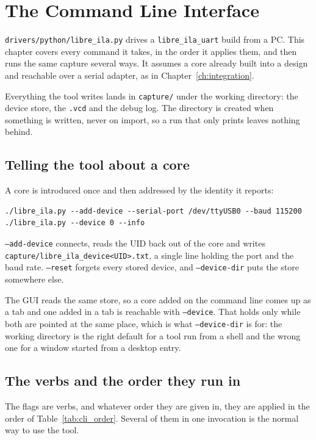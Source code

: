 \documentclass[../manual.tex]{subfiles}
\begin{document}
\chapter{The Command Line Interface}
\label{ch:cli}

\texttt{drivers/python/libre\_ila.py} drives a \texttt{libre\_ila\_uart} build from a PC. This chapter covers every command it takes, in the order it applies them, and then runs the same capture several ways. It assumes a core already built into a design and reachable over a serial adapter, as in Chapter~\ref{ch:integration}.

Everything the tool writes lands in \texttt{capture/} under the working directory: the device store, the \texttt{.vcd} and the debug log. The directory is created when something is written, never on import, so a run that only prints leaves nothing behind.

\section{Telling the tool about a core}
\label{sec:cli_devices}

A core is introduced once and then addressed by the identity it reports:

\begin{lstlisting}
./libre_ila.py --add-device --serial-port /dev/ttyUSB0 --baud 115200
./libre_ila.py --device 0 --info
\end{lstlisting}

\texttt{--add-device} connects, reads the UID back out of the core and writes \texttt{capture/libre\_ila\_device<UID>.txt}, a single line holding the port and the baud rate. \texttt{--reset} forgets every stored device, and \texttt{--device-dir} puts the store somewhere else.


The GUI reads the same store, so a core added on the command line comes up as a tab and one added in a tab is reachable with \texttt{--device}. That holds only while both are pointed at the same place, which is what \texttt{--device-dir} is for: the working directory is the right default for a tool run from a shell and the wrong one for a window started from a desktop entry.

\section{The verbs and the order they run in}
\label{sec:cli_verbs}

The flags are verbs, and whatever order they are given in, they are applied in the order of Table~\ref{tab:cli_order}. Several of them in one invocation is the normal way to use the tool.
\end{document}
